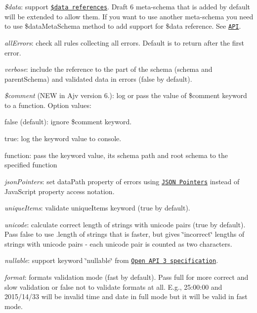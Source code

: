 \begin{DoxyItemize}
\item {\itshape \$data}\+: support \href{#data-reference}{\tt \$data references}. Draft 6 meta-\/schema that is added by default will be extended to allow them. If you want to use another meta-\/schema you need to use \$data\+Meta\+Schema method to add support for \$data reference. See \href{#api}{\tt A\+PI}.
\item {\itshape all\+Errors}\+: check all rules collecting all errors. Default is to return after the first error.
\item {\itshape verbose}\+: include the reference to the part of the schema ({\ttfamily schema} and {\ttfamily parent\+Schema}) and validated data in errors (false by default).
\item {\itshape \$comment} (N\+EW in Ajv version 6.)\+: log or pass the value of {\ttfamily \$comment} keyword to a function. Option values\+:
\begin{DoxyItemize}
\item {\ttfamily false} (default)\+: ignore \$comment keyword.
\item {\ttfamily true}\+: log the keyword value to console.
\item function\+: pass the keyword value, its schema path and root schema to the specified function
\end{DoxyItemize}
\item {\itshape json\+Pointers}\+: set {\ttfamily data\+Path} property of errors using \href{https://tools.ietf.org/html/rfc6901}{\tt J\+S\+ON Pointers} instead of Java\+Script property access notation.
\item {\itshape unique\+Items}\+: validate {\ttfamily unique\+Items} keyword (true by default).
\item {\itshape unicode}\+: calculate correct length of strings with unicode pairs (true by default). Pass {\ttfamily false} to use {\ttfamily .length} of strings that is faster, but gives \char`\"{}incorrect\char`\"{} lengths of strings with unicode pairs -\/ each unicode pair is counted as two characters.
\item {\itshape nullable}\+: support keyword \char`\"{}nullable\char`\"{} from \href{https://swagger.io/docs/specification/data-models/data-types/}{\tt Open A\+PI 3 specification}.
\item {\itshape format}\+: formats validation mode (\textquotesingle{}fast\textquotesingle{} by default). Pass \textquotesingle{}full\textquotesingle{} for more correct and slow validation or {\ttfamily false} not to validate formats at all. E.\+g., 25\+:00\+:00 and 2015/14/33 will be invalid time and date in \textquotesingle{}full\textquotesingle{} mode but it will be valid in \textquotesingle{}fast\textquotesingle{} mode.

\end{DoxyItemize}
